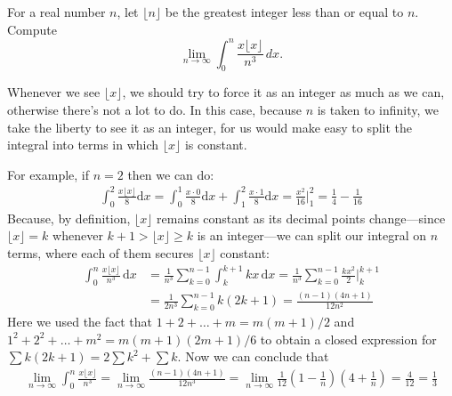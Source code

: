 \begin{problem}
    For a real number \( n \), let \( \lfloor n \rfloor \) be the greatest integer less than or equal to \( n \). Compute
    \[
    \lim_{n \to \infty} \int_0^n \frac{x \lfloor x \rfloor}{n^3} \, dx.
    \]
\end{problem}

\begin{solution}[$1/3$]
    Whenever we see $\lfloor x \rfloor$, we should try to force it as an integer as much as we can, otherwise there's not a lot to do. In this case, because $n$ is taken to infinity, we take the liberty to see it as an integer, for us would make easy to split the integral into terms in which $\lfloor x \rfloor $ is constant. 

    For example, if $n=2$ then we can do:
    \begin{align*}
        \int_0^2 \frac{x \lfloor x \rfloor}{8} \mathrm{d}x = \int_0^1 \frac{x \cdot 0}{8} \mathrm{d}x + \int_1^2 \frac{x \cdot 1}{8} \mathrm{d}x = \frac{x^2}{16} \bigg|_1^2 = \frac{1}{4} - \frac{1}{16}
    \end{align*}
    Because, by definition, $\lfloor x \rfloor$ remains constant as its decimal points change---since $\lfloor x \rfloor=k$ whenever $k + 1 > \lfloor x \rfloor \geq k$ is an integer---we can split our integral on $n$ terms, where each of them secures $\lfloor x \rfloor$ constant:
    \begin{align*}
        \int_0^n \frac{x \lfloor x \rfloor}{n^3} \, \mathrm{d}x &=
        \frac{1}{n^3}\sum_{k=0}^{n-1} \int_k^{k+1} k  x \, \mathrm{d}x = 
        \frac{1}{n^3} \sum_{k=0}^{n-1} \frac{kx^2}{2} \bigg|_k^{k+1} \\
        &= \frac{1}{2n^3} \sum_{k=0}^{n-1} k(2k+1) = \frac{(n-1)(4n+1)}{12n^2}
    \end{align*}
    Here we used the fact that $1+2+\ldots+m=m(m+1)/2$ and $1^2+2^2+ \ldots +m^2 = m(m+1)(2m+1)/6$ to obtain a closed expression for $\sum k(2k+1) = 2\sum k^2+ \sum k$. Now we can conclude that
    \begin{align*}
        \lim_{n \rightarrow \infty} \int _0^n \frac{x \lfloor x \rfloor}{n^3} =
        \lim_{n \rightarrow \infty} \frac{(n-1)(4n+1)}{12n^3} =
        \lim_{n \rightarrow \infty} \frac{1}{12}\left(1 - \frac{1}{n}\right) \left(4 + \frac{1}{n} \right) =
        \frac{4}{12} = \boxed{\frac{1}{3}}
    \end{align*}
\end{solution}

